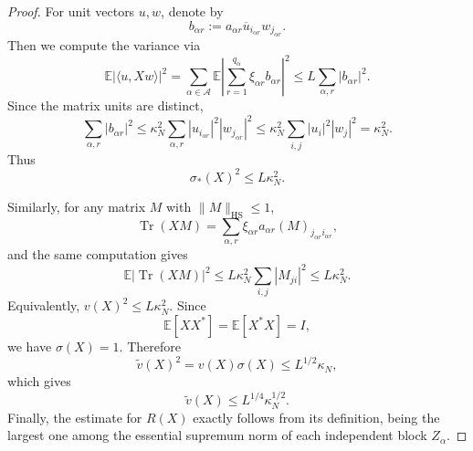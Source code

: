 \documentclass[10pt,a4paper]{amsart}
\theoremstyle{plain}
\theoremstyle{remark}
\begin{document}
\begin{proof}
For unit vectors \(u,w\), denote by
\[
b_{\alpha r}:=a_{\alpha r}\overline{u}_{i_{\alpha r}}w_{j_{\alpha r}}.
\]
Then we compute the variance via
\[
\mathbb E|\langle u,Xw\rangle|^2
=
\sum_{\alpha\in\mathcal A}
\mathbb E\left|\sum_{r=1}^{q_\alpha}\xi_{\alpha r}b_{\alpha r}\right|^2
\le
L\sum_{\alpha,r}|b_{\alpha r}|^2.
\]
Since the matrix units are distinct,
\[
\sum_{\alpha,r}|b_{\alpha r}|^2
\le
\kappa_N^2
\sum_{\alpha,r}|u_{i_{\alpha r}}|^2|w_{j_{\alpha r}}|^2
\le
\kappa_N^2
\sum_{i,j}|u_i|^2|w_j|^2
=
\kappa_N^2.
\]
Thus
\[
\sigma_*(X)^2\le L\kappa_N^2.
\]

Similarly, for any matrix \(M\) with \(\|M\|_{\mathrm{HS}}\le1\),
\[
\operatorname{Tr}(XM)
=
\sum_{\alpha,r}\xi_{\alpha r}a_{\alpha r}(M)_{j_{\alpha r}i_{\alpha r}},
\]
and the same computation gives
\[
\mathbb E|\operatorname{Tr}(XM)|^2
\le
L\kappa_N^2\sum_{i,j}|M_{ji}|^2
\le
L\kappa_N^2.
\]
Equivalently, \(v(X)^2\le L\kappa_N^2\). Since
\[
\mathbb E[XX^*]=\mathbb E[X^*X]=I,
\]
we have \(\sigma(X)=1\). Therefore
\[
\widetilde v(X)^2=v(X)\sigma(X)\le L^{1/2}\kappa_N,
\]
which gives
\[
\widetilde v(X)\le L^{1/4}\kappa_N^{1/2}.
\]
Finally, the estimate for \(R(X)\) exactly follows from its definition, being the largest one among the essential
supremum norm of each independent block $Z_\alpha$. 
\end{proof}
\end{document}
